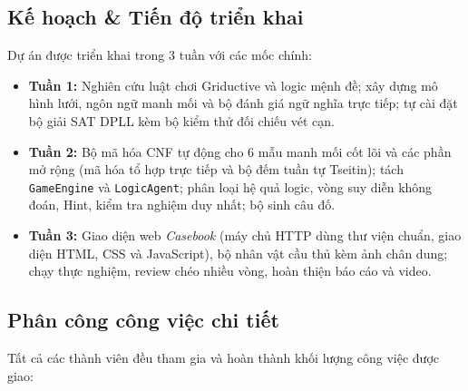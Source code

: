 \documentclass{article}
\newcommand{\code}[1]{\texttt{#1}}
\begin{document}
\subsection{Kế hoạch \& Tiến độ triển khai}
Dự án được triển khai trong 3 tuần với các mốc chính:
\begin{itemize}[noitemsep]
    \item \textbf{Tuần 1:} Nghiên cứu luật chơi Griductive và logic mệnh đề; xây dựng mô hình lưới, ngôn ngữ manh mối và bộ đánh giá ngữ nghĩa trực tiếp; tự cài đặt bộ giải SAT DPLL kèm bộ kiểm thử đối chiếu vét cạn.
    \item \textbf{Tuần 2:} Bộ mã hóa CNF tự động cho 6 mẫu manh mối cốt lõi và các phần mở rộng (mã hóa tổ hợp trực tiếp và bộ đếm tuần tự Tseitin); tách \code{GameEngine} và \code{LogicAgent}; phân loại hệ quả logic, vòng suy diễn không đoán, Hint, kiểm tra nghiệm duy nhất; bộ sinh câu đố.
    \item \textbf{Tuần 3:} Giao diện web \textit{Casebook} (máy chủ HTTP dùng thư viện chuẩn, giao diện HTML, CSS và JavaScript), bộ nhân vật cầu thủ kèm ảnh chân dung; chạy thực nghiệm, review chéo nhiều vòng, hoàn thiện báo cáo và video.
\end{itemize}

\subsection{Phân công công việc chi tiết}
Tất cả các thành viên đều tham gia và hoàn thành khối lượng công việc được giao:
\end{document}
